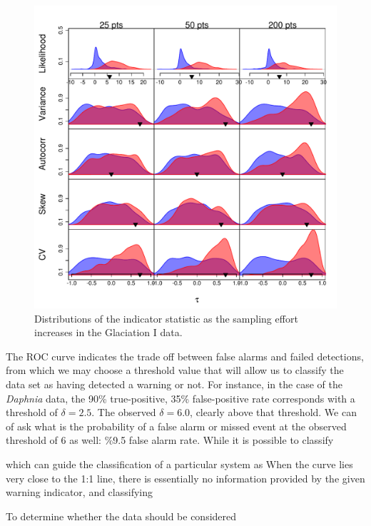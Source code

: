 \documentclass[authoryear,review,11pt]{elsarticle}
\begin{document}
\begin{figure}[ht]
  \begin{center}
    \includegraphics{FigS4.pdf}
  \end{center}
  \caption{Distributions of the indicator statistic as the sampling effort increases in the Glaciation I data.}
  \label{fig:S4}
\end{figure}



The ROC curve indicates the trade off between false alarms and failed detections, 
from which we may choose a threshold value that will allow us to classify the data set as having detected a warning or not.  
For instance, in the case of the \emph{Daphnia} data, the 90\% true-positive, 35\% false-positive rate corresponds with a threshold of 
$\delta = 2.5$.  The observed $\delta=6.0$, clearly above that threshold.  
We can of ask what is the probability of a false alarm or missed event at the observed threshold of 6 as well: \%9.5 false alarm rate.  
While it is possible to classify 


which can guide the classification of a particular system as 
When the curve lies very close to the 1:1 line, there is essentially no information provided by the given warning indicator,
and classifying

To determine whether the data should be considered 


 \section*{ }%
 

 
\end{document}
